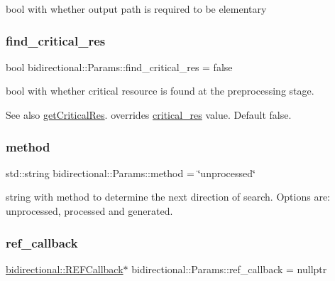 bool with whether output path is required to be elementary 

\mbox{\label{classbidirectional_1_1Params_aafe66809d74beb22c445a72ca7955f85}} 
\subsubsection{\texorpdfstring{find\+\_\+critical\+\_\+res}{find\_critical\_res}}
{\footnotesize\ttfamily bool bidirectional\+::\+Params\+::find\+\_\+critical\+\_\+res = false}

bool with whether critical resource is found at the preprocessing stage. \begin{DoxySeeAlso}{See also}
\hyperlink{namespacebidirectional_a7b92b2282139801a9e2668a743ad07a1}{get\+Critical\+Res}. overrides \hyperlink{classbidirectional_1_1Params_a7d318c4af901a82c3f566d59c6de1b62}{critical\+\_\+res} value. Default false. 
\end{DoxySeeAlso}
\mbox{\label{classbidirectional_1_1Params_a2faf36e89993c9fd0979e3e42b2332ea}} 
\subsubsection{\texorpdfstring{method}{method}}
{\footnotesize\ttfamily std\+::string bidirectional\+::\+Params\+::method = \char`\"{}unprocessed\char`\"{}}

string with method to determine the next direction of search. Options are\+: unprocessed, processed and generated. \mbox{\label{classbidirectional_1_1Params_afa96dcebb31c930ea4bd339fc72779a5}} 
\subsubsection{\texorpdfstring{ref\+\_\+callback}{ref\_callback}}
{\footnotesize\ttfamily \hyperlink{classbidirectional_1_1REFCallback}{bidirectional\+::\+R\+E\+F\+Callback}$\ast$ bidirectional\+::\+Params\+::ref\+\_\+callback = nullptr}



